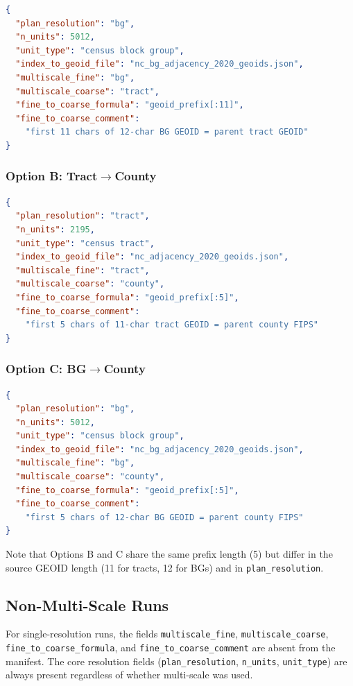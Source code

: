 \begin{lstlisting}[language=json]
{
  "plan_resolution": "bg",
  "n_units": 5012,
  "unit_type": "census block group",
  "index_to_geoid_file": "nc_bg_adjacency_2020_geoids.json",
  "multiscale_fine": "bg",
  "multiscale_coarse": "tract",
  "fine_to_coarse_formula": "geoid_prefix[:11]",
  "fine_to_coarse_comment":
    "first 11 chars of 12-char BG GEOID = parent tract GEOID"
}
\end{lstlisting}

\subsubsection{Option B: Tract$\to$County}

\begin{lstlisting}[language=json]
{
  "plan_resolution": "tract",
  "n_units": 2195,
  "unit_type": "census tract",
  "index_to_geoid_file": "nc_adjacency_2020_geoids.json",
  "multiscale_fine": "tract",
  "multiscale_coarse": "county",
  "fine_to_coarse_formula": "geoid_prefix[:5]",
  "fine_to_coarse_comment":
    "first 5 chars of 11-char tract GEOID = parent county FIPS"
}
\end{lstlisting}

\subsubsection{Option C: BG$\to$County}

\begin{lstlisting}[language=json]
{
  "plan_resolution": "bg",
  "n_units": 5012,
  "unit_type": "census block group",
  "index_to_geoid_file": "nc_bg_adjacency_2020_geoids.json",
  "multiscale_fine": "bg",
  "multiscale_coarse": "county",
  "fine_to_coarse_formula": "geoid_prefix[:5]",
  "fine_to_coarse_comment":
    "first 5 chars of 12-char BG GEOID = parent county FIPS"
}
\end{lstlisting}

\noindent
Note that Options B and C share the same prefix length (5) but differ in
the source GEOID length (11 for tracts, 12 for BGs) and in
\texttt{plan\_resolution}.

\subsection{Non-Multi-Scale Runs}

For single-resolution runs, the fields \texttt{multiscale\_fine},
\texttt{multiscale\_coarse}, \texttt{fine\_to\_coarse\_formula},
and \texttt{fine\_to\_coarse\_comment} are absent from the manifest.
The core resolution fields (\texttt{plan\_resolution}, \texttt{n\_units},
\texttt{unit\_type}) are always present regardless of whether multi-scale
was used.

